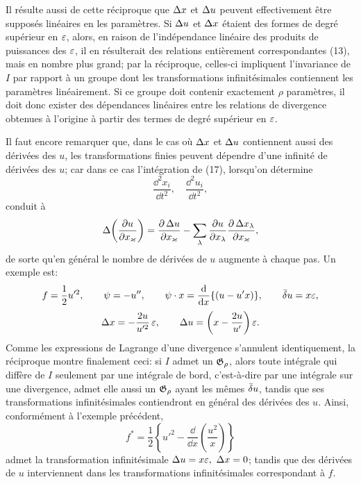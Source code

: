 Il résulte aussi de cette réciproque que \(\Delta x\) et \(\Delta u\) peuvent effectivement être supposés linéaires en les paramètres. Si \(\Delta u\) et \(\Delta x\) étaient des formes de degré supérieur en \(\varepsilon\), alors, en raison de l'indépendance linéaire des produits de puissances des \(\varepsilon\), il en résulterait des relations entièrement correspondantes (13), mais en nombre plus grand; par la réciproque, celles-ci impliquent l'invariance de \(I\) par rapport à un groupe dont les transformations infinitésimales contiennent les paramètres linéairement. Si ce groupe doit contenir exactement \(\rho\) paramètres, il doit donc exister des dépendances linéaires entre les relations de divergence obtenues à l'origine à partir des termes de degré supérieur en \(\varepsilon\).

Il faut encore remarquer que, dans le cas où \(\Delta x\) et \(\Delta u\) contiennent aussi des dérivées des \(u\), les transformations finies peuvent dépendre d'une infinité de dérivées des \(u\); car dans ce cas l'intégration de (17), lorsqu'on détermine
\[
\frac{\dd^2x_i}{\dd t^2},\quad \frac{\dd^2u_i}{\dd t^2},
\]
conduit à
\[
\Delta\!\left(\frac{\partial u}{\partial x_\varkappa}\right)
=\frac{\partial\,\Delta u}{\partial x_\varkappa}
-\sum_\lambda\frac{\partial u}{\partial x_\lambda}
\frac{\partial\,\Delta x_\lambda}{\partial x_\varkappa},
\]
de sorte qu'en général le nombre de dérivées de \(u\) augmente à chaque pas. Un exemple est:
\[
f=\frac12 u'^2,\qquad
\psi=-u'',\qquad
\psi\cdot x=\frac{\mathrm d}{\mathrm d x}\{(u-u'x)\},\qquad
\bar{\delta} u=x\varepsilon,
\]
\[
\Delta x=-\frac{2u}{u'^2}\,\varepsilon,\qquad
\Delta u=\left(x-\frac{2u}{u'}\right)\varepsilon.
\]
Comme les expressions de Lagrange d'une divergence s'annulent identiquement, la réciproque montre finalement ceci: si \(I\) admet un \(\mathfrak G_\rho\), alors toute intégrale qui diffère de \(I\) seulement par une intégrale de bord, c'est-à-dire par une intégrale sur une divergence, admet elle aussi un \(\mathfrak G_\rho\) ayant les mêmes \(\bar{\delta} u\), tandis que ses transformations infinitésimales contiendront en général des dérivées des \(u\). Ainsi, conformément à l'exemple précédent,
\[
f^*=\frac12\left\{u'^2-\frac{\dd}{\dd x}\left(\frac{u^2}{x}\right)\right\}
\]
admet la transformation infinitésimale \(\Delta u=x\varepsilon,\ \Delta x=0\); tandis que des dérivées de \(u\) interviennent dans les transformations infinitésimales correspondant à \(f\).

